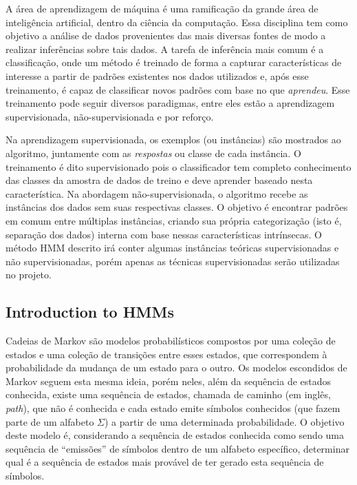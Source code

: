 A área de aprendizagem de máquina é uma ramificação da grande área de inteligência artificial, dentro da ciência da computação. Essa disciplina tem como objetivo a análise de dados provenientes das mais diversas fontes de modo a realizar inferências sobre tais dados. A tarefa de inferência mais comum é a classificação, onde um método é treinado de forma a capturar características de interesse a partir de padrões existentes nos dados utilizados e, após esse treinamento, é capaz de classificar novos padrões com base no que \emph{aprendeu}. Esse treinamento pode seguir diversos paradigmas, entre eles estão a aprendizagem supervisionada, não-supervisionada e por reforço.

Na aprendizagem supervisionada, os exemplos (ou instâncias) são mostrados ao algoritmo, juntamente com as \emph{respostas} ou classe de cada instância. O treinamento é dito supervisionado pois o classificador tem completo conhecimento das classes da amostra de dados de treino e deve aprender baseado nesta característica. Na abordagem não-supervisionada, o algoritmo recebe as instâncias dos dados sem suas respectivas classes. O objetivo é encontrar padrões em comum entre múltiplas instâncias, criando sua própria categorização (isto é, separação dos dados) interna com base nessas características intrínsecas. O método HMM descrito irá conter algumas instâncias teóricas supervisionadas e não supervisionadas, porém apenas as técnicas supervisionadas serão utilizadas no projeto.


\subsection{Introduction to HMMs}
\label{sec:introduction.hmms}

Cadeias de Markov são modelos probabilísticos compostos por uma coleção de estados e uma coleção de transições entre esses estados, que correspondem à probabilidade da mudança de um estado para o outro. Os modelos escondidos de Markov seguem esta mesma ideia, porém neles, além da sequência de estados conhecida, existe uma sequência de estados, chamada de caminho (em inglês, \emph{path}), que não é conhecida e cada estado emite símbolos conhecidos (que fazem parte de um alfabeto $ \Sigma $) a partir de uma determinada probabilidade. O objetivo deste modelo é, considerando a sequência de estados conhecida como sendo uma sequência de ``emissões'' de símbolos dentro de um alfabeto específico, determinar qual é a sequência de estados mais provável de ter gerado esta sequência de símbolos.

